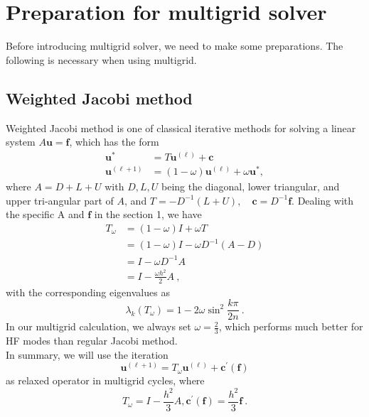 \documentclass[a4paper,twocolumn]{article}
\theoremstyle{definition}
\begin{document}
\section{Preparation for multigrid solver}
Before introducing multigrid solver, we need to make some preparations. The following is necessary when using multigrid.
\subsection{Weighted Jacobi method}
Weighted Jacobi method is one of classical iterative methods for solving a linear system $A\textbf{u} = \textbf{f}$, which has the form
$$
\begin{aligned}
\mathbf{u}^{*} &=T \mathbf{u}^{(\ell)}+\mathbf{c} \\
\mathbf{u}^{(\ell+1)} &=(1-\omega) \mathbf{u}^{(\ell)}+\omega \mathbf{u}^{*},
\end{aligned}
$$
where $A = D + L + U$ with $D, L, U$ being the diagonal, lower triangular, and upper tri-angular part of $A$, and $T=-D^{-1}(L+U), \quad \mathbf{c}=D^{-1} \mathbf{f}$.
\newpage
\noindent Dealing with the specific A and $\mathbf{f}$ in the section 1, we have
$$
\begin{aligned}
T_{\omega}&= (1-\omega)I+\omega T \\
&=(1-\omega)I - \omega D^{-1}(A-D) \\
&=I - \omega D^{-1}A \\
&=I - \frac{\omega h^2}{2}A \ ,
\end{aligned}
$$
with the corresponding eigenvalues as
$$
\lambda_k(T_{\omega}) = 1 - 2\omega \sin^2\frac{k\pi}{2n} \ .
$$
In our multigrid calculation, we always set $\omega = \frac{2}{3}$,
which performs much better for HF modes than regular Jacobi method.\\
In summary, we will use the iteration
$$
\mathbf{u}^{(\ell+1)} =T_{\omega} \mathbf{u}^{(\ell)}+\mathbf{c}^{\prime}(\mathbf{f})
$$
as relaxed operator in multigrid cycles, where 
$$
T_{\omega} = I - \frac{h^2}{3}A , \mathbf{c}^{\prime}(\mathbf{f}) = \frac{h^2}{3}\mathbf{f} \ .
$$
\end{document}
